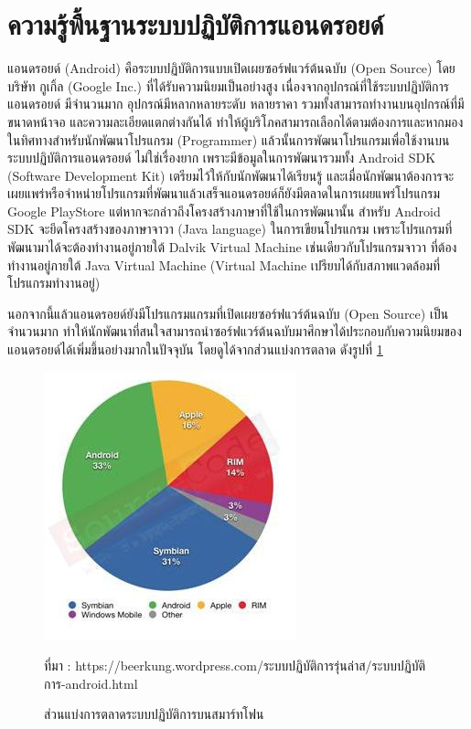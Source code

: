 \section{ความรู้พื้นฐานระบบปฏิบัติการแอนดรอยด์}
	แอนดรอยด์ (Android) คือระบบปฏิบัติการแบบเปิดเผยซอร์ฟแวร์ต้นฉบับ (Open Source) โดยบริษัท กูเกิ้ล (Google Inc.) ที่ได้รับความนิยมเป็นอย่างสูง เนื่องจากอุปกรณ์ที่ใช้ระบบปฏิบัติการแอนดรอยด์ มีจำนวนมาก อุปกรณ์มีหลากหลายระดับ หลายราคา รวมทั้งสามารถทำงานบนอุปกรณ์ที่มีขนาดหน้าจอ และความละเอียดแตกต่างกันได้ ทำให้ผู้บริโภคสามารถเลือกได้ตามต้องการและหากมองในทิศทางสำหรับนักพัฒนาโปรแกรม (Programmer) แล้วนั้นการพัฒนาโปรแกรมเพื่อใช้งานบนระบบปฏิบัติการแอนดรอยด์ ไม่ใช่เรื่องยาก เพราะมีข้อมูลในการพัฒนารวมทั้ง Android SDK (Software Development Kit) เตรียมไว้ให้กับนักพัฒนาได้เรียนรู้ และเมื่อนักพัฒนาต้องการจะเผยแพร่หรือจำหน่ายโปรแกรมที่พัฒนาแล้วเสร็จแอนดรอยด์ก็ยังมีตลาดในการเผยแพร่โปรแกรม Google PlayStore แต่หากจะกล่าวถึงโครงสร้างภาษาที่ใช้ในการพัฒนานั้น สำหรับ Android SDK จะยึดโครงสร้างของภาษาจาวา (Java language) ในการเขียนโปรแกรม เพราะโปรแกรมที่พัฒนามาได้จะต้องทำงานอยู่ภายใต้ Dalvik Virtual Machine เช่นเดียวกับโปรแกรมจาวา ที่ต้องทำงานอยู่ภายใต้ Java Virtual Machine (Virtual Machine เปรียบได้กับสภาพแวดล้อมที่โปรแกรมทำงานอยู่)
	
	นอกจากนี้แล้วแอนดรอยด์ยังมีโปรแกรมแกรมที่เปิดเผยซอร์ฟแวร์ต้นฉบับ (Open Source) เป็นจำนวนมาก ทำให้นักพัฒนาที่สนใจสามารถนำซอร์ฟแวร์ต้นฉบับมาศึกษาได้ประกอบกับความนิยมของแอนดรอยด์ได้เพิ่มขึ้นอย่างมากในปัจจุบัน โดยดูได้จากส่วนแบ่งการตลาด ดังรูปที่ \ref{Fig:maketshare}
	
	\begin{figure}[H]
		\centering
		\includegraphics[width=0.5\columnwidth]{Figures/2/maketshare}
		\caption{ส่วนแบ่งการตลาดระบบปฏิบัติการบนสมาร์ทโฟน}{ที่มา :  https://beerkung.wordpress.com/ระบบปฏิบัติการรุ่นล่าส/ระบบปฏิบัติการ-android.html}
		\label{Fig:maketshare}
	\end{figure}

